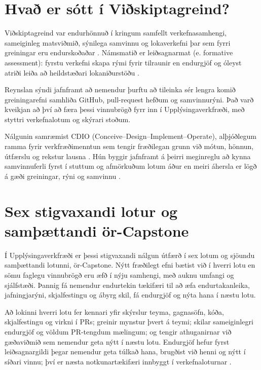 \documentclass{kennsluakademia_conf}
\begin{document}
\section{Hvað er sótt í Viðskiptagreind?}

Viðskiptagreind var endurhönnuð í kringum samfellt verkefnasamhengi, sameiginleg matsviðmið, sýnilega samvinnu og lokaverkefni þar sem fyrri greiningar eru endurskoðaðar \citep{Ingimundardottir2025Setberg,Ingimundardottir2026Industry}. Námsmatið er leiðsagnarmat (e. formative assessment): fyrstu verkefni skapa rými fyrir tilraunir en endurgjöf og óleyst atriði leiða að heildstæðari lokaniðurstöðu \citep{Sadler1989FormativeAssessment}.

Reynslan sýndi jafnframt að nemendur þurftu að tileinka sér lengra komið greiningarefni samhliða GitHub, pull-request hefðum og samvinnurýni. Það varð kveikjan að því að færa þessi vinnubrögð fyrr inn í Upplýsingaverkfræði, með styttri verkefnalotum og skýrari stoðum.

Nálgunin samræmist CDIO (Conceive--Design--Implement--Operate), alþjóðlegum ramma fyrir verkfræðimenntun sem tengir fræðilegan grunn við mótun, hönnun, útfærslu og rekstur lausna \citep{CDIOInitiativeStandards30,EdstromKolmos2014PBLCDIO}. Hún byggir jafnframt á þeirri meginreglu að kynna samvinnuferli fyrst í stuttum og afmörkuðum lotum áður en meiri áhersla er lögð á gæði greiningar, rýni og samvinnu \citep{Ingimundardottir2026GitHub}.


\section{Sex stigvaxandi lotur og samþættandi ör-Capstone}

Í Upplýsingaverkfræði er þessi stigvaxandi nálgun útfærð í sex lotum og sjöundu samþættandi lotunni, ör-Capstone. Nýtt fræðilegt efni bætist við í hverri lotu en sömu faglegu vinnubrögð eru æfð í nýju samhengi, með auknu umfangi og sjálfstæði. Þannig fá nemendur endurtekin tækifæri til að æfa endurtakanleika, jafningjarýni, skjalfestingu og ábyrg skil, fá endurgjöf og nýta hana í næstu lotu.

Að lokinni hverri lotu fer kennari yfir skýrslur teyma, gagnasöfn, kóða, skjalfestingu og virkni í PRs; greinir mynstur þvert á teymi; skilar sameiginlegri endurgjöf og völdum PR-tengdum mælingum; og tengir athuganirnar við gæðaviðmið sem nemendur geta nýtt í næstu lotu. Endurgjöf hefur fyrst leiðsagnargildi þegar nemendur geta túlkað hana, brugðist við henni og nýtt í síðari vinnu; því er næsta notkunartækifæri innbyggt í verkefnaloturnar \citep{BoudMolloy2013FeedbackDesign,CarlessBoud2018FeedbackLiteracy}.
\end{document}
